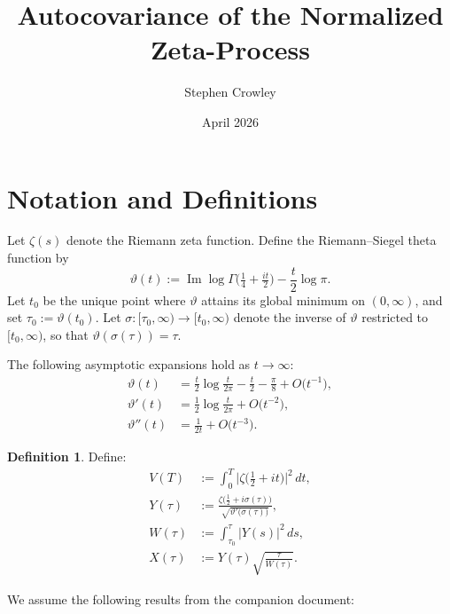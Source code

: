 \documentclass[11pt]{article}
\title{Autocovariance of the Normalized Zeta-Process}
\author{Stephen Crowley}
\date{April 2026}
\theoremstyle{plain}
\theoremstyle{definition}
\newtheorem{definition}[theorem]{Definition}
\newcommand{\assign}{:=}
\begin{document}
\maketitle

\section{Notation and Definitions}

Let $\zeta(s)$ denote the Riemann zeta function.
Define the Riemann--Siegel theta function by
\begin{equation}\label{eq:theta-def}
\vartheta(t)
\assign
\operatorname{Im}\log\Gamma\!\bigl(\tfrac{1}{4}+\tfrac{it}{2}\bigr)
- \frac{t}{2}\log\pi.
\end{equation}
Let $t_0$ be the unique point where $\vartheta$ attains its global minimum
on $(0,\infty)$, and set $\tau_0\assign\vartheta(t_0)$.
Let $\sigma:[\tau_0,\infty)\to[t_0,\infty)$ denote the inverse of $\vartheta$
restricted to $[t_0,\infty)$, so that $\vartheta(\sigma(\tau))=\tau$.

The following asymptotic expansions hold as $t\to\infty$:
\begin{align}
\vartheta(t)
&= \frac{t}{2}\log\frac{t}{2\pi} - \frac{t}{2}
   - \frac{\pi}{8} + O\bigl(t^{-1}\bigr),
\label{eq:theta-asymp}\\
\vartheta'(t)
&= \frac{1}{2}\log\frac{t}{2\pi} + O\bigl(t^{-2}\bigr),
\label{eq:thetap-asymp}\\
\vartheta''(t)
&= \frac{1}{2t} + O\bigl(t^{-3}\bigr).
\label{eq:thetapp-asymp}
\end{align}

\begin{definition}\label{def:all}
Define:
\begin{align}
V(T) &\assign \int_0^T
  \bigl|\zeta\bigl(\tfrac{1}{2}+it\bigr)\bigr|^2\,dt,
\label{eq:V}\\
Y(\tau) &\assign
  \frac{\zeta\bigl(\tfrac{1}{2}+i\sigma(\tau)\bigr)}
       {\sqrt{\vartheta'\bigl(\sigma(\tau)\bigr)}},
\label{eq:Y}\\
W(\tau) &\assign \int_{\tau_0}^{\tau} |Y(s)|^2\,ds,
\label{eq:W}\\
X(\tau) &\assign Y(\tau)\sqrt{\frac{\tau}{W(\tau)}}.
\label{eq:X}
\end{align}
\end{definition}

We assume the following results from the companion document:
\end{document}
